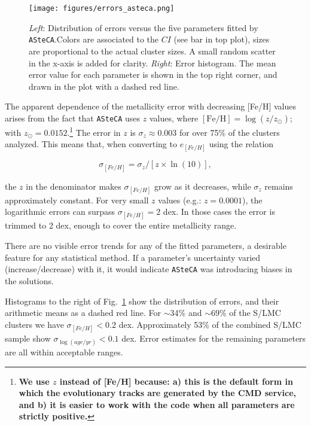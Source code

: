 \documentclass[referee]{aa}
\begin{document}
\begin{figure}[!ht]
\centering
\texttt{[image: figures/errors\_asteca.png]}
\caption{\emph{Left}: Distribution of errors versus the five parameters fitted
by \texttt{ASteCA}.\@ Colors are associated to the $CI$ (see bar in top plot),
sizes are proportional to the actual cluster sizes. A small random scatter in
the x-axis is added for clarity.
\emph{Right}: Error histogram. The mean error value for each parameter is shown
in the top right corner, and drawn in the plot with a dashed red line.}
\label{fig:errors}
\end{figure}

The apparent dependence of the metallicity error with decreasing [Fe/H] values
arises from the fact that \texttt{ASteCA} uses $z$ values, where
$\mathrm{[Fe/H]}{=}\log(z/z_{\odot})$; with $z_{\odot}{=}0.0152$.\footnote{
\textbf{We use $z$ instead of [Fe/H] because: a) this is the default form in
which the evolutionary tracks are generated by the CMD service, and b) it is
easier to work with the code when all parameters are strictly positive.}}
The error in $z$ is $\sigma_z{\approx}0.003$ for over 75\% of the clusters
analyzed. This means that, when converting to $e_{[Fe/H]}$ using the relation

\begin{equation}
\sigma_{[Fe/H]} = \sigma_z/[z\times\ln(10)],
\end{equation}

\noindent the $z$ in the denominator makes $\sigma_{[Fe/H]}$ grow as it
decreases, while $\sigma_z$ remains approximately constant.
For very small $z$ values (e.g.: $z{=}0.0001$), the logarithmic errors can
surpass $\sigma_{[Fe/H]}{=}2$ dex. In those cases the error is trimmed to 2 dex,
enough to cover the entire metallicity range.

There are no visible error trends for any of the fitted parameters, a desirable
feature for any statistical method. If a parameter's uncertainty varied 
(increase/decrease) with it, it would indicate \texttt{ASteCA} was
introducing biases in the solutions.

Histograms to the right of Fig.~\ref{fig:errors} show the distribution
of errors, and their arithmetic means as a dashed red line.
For $\sim$34\% and ${\sim}69\%$ of the S/LMC clusters we have
$\sigma_{[Fe/H]}{<}0.2$ dex.
Approximately 53\% of the combined S/LMC sample show
$\sigma_{\log(age/yr)}{<}0.1$ dex. Error estimates for the remaining parameters
are all within acceptable ranges.\\
\end{document}
